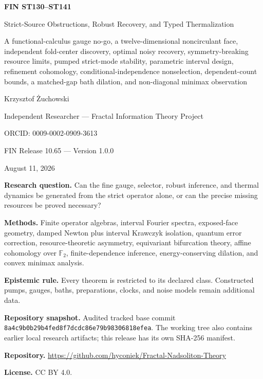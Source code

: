 \documentclass[11pt,a4paper]{article}
\begin{document}
\begin{titlepage}
\centering
\vspace*{1.0cm}
{\LARGE\bfseries FIN ST130--ST141\par}
\vspace{0.30cm}
{\Large Strict-Source Obstructions, Robust Recovery, and Typed Thermalization\par}
\vspace{0.42cm}
{\large A functional-calculus gauge no-go, a twelve-dimensional noncirculant face, independent fold-center discovery, optimal noisy recovery, symmetry-breaking resource limits, pumped strict-mode stability, parametric interval design, refinement cohomology, conditional-independence nonselection, dependent-count bounds, a matched-gap bath dilation, and non-diagonal minimax observation\par}
\vspace{0.80cm}
{\Large Krzysztof \.{Z}uchowski\par}
\vspace{0.20cm}
{\large Independent Researcher --- Fractal Information Theory Project\par}
{\large ORCID: 0009-0002-0909-3613\par}
\vspace{0.60cm}
{\large FIN Release 10.65 --- Version 1.0.0\par}
{\large August 11, 2026\par}
\vfill
\begin{minipage}{0.91\textwidth}
\textbf{Research question.} Can the fine gauge, selector, robust inference, and thermal dynamics be generated from the strict operator alone, or can the precise missing resources be proved necessary?\par
\textbf{Methods.} Finite operator algebras, interval Fourier spectra, exposed-face geometry, damped Newton plus interval Krawczyk isolation, quantum error correction, resource-theoretic asymmetry, equivariant bifurcation theory, affine cohomology over $\mathbb F_2$, finite-dependence inference, energy-conserving dilation, and convex minimax analysis.\par
\textbf{Epistemic rule.} Every theorem is restricted to its declared class. Constructed pumps, gauges, baths, preparations, clocks, and noise models remain additional data.\par
\textbf{Repository snapshot.} Audited tracked base commit \texttt{8a4c9b0b29b4fed8f7dcdc86e79b98306818efea}. The working tree also contains earlier local research artifacts; this release has its own SHA-256 manifest.\par
\textbf{Repository.} \url{https://github.com/hyconiek/Fractal-Nadsoliton-Theory}\par
\textbf{License.} CC BY 4.0.
\end{minipage}
\end{titlepage}
\end{document}
